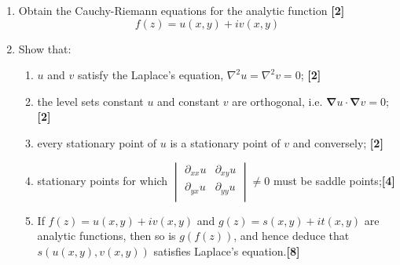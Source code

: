 \documentclass[a4paper]{article}
\begin{document}
\begin{qns}\leavevmode
\begin{enumerate}[label=(\alph*)]
    \item Obtain the Cauchy-Riemann equations for the analytic function \hfill \textbf{[2]}$$f(z)=u(x,y)+iv(x,y)$$
    \item Show that:
    \begin{enumerate}[label=(\roman*)]
        \item $u$ and $v$ satisfy the Laplace's equation, $\nabla^2u=\nabla^2v=0$; \hfill \textbf{[2]}
        \item the level sets constant $u$ and constant $v$ are orthogonal, i.e. $\boldsymbol{\nabla}u\cdot\boldsymbol{\nabla}v=0$; \hfill \textbf{[2]}
        \item every stationary point of $u$ is a stationary point of $v$ and conversely; \hfill \textbf{[2]}
        \item stationary points for which
        $\begin{vmatrix}\partial_{xx}u&\partial_{xy}u\\\partial_{yx}u&\partial_{yy}u\\\end{vmatrix}\neq0$ must be saddle points;\hfill \textbf{[4]}
    \item If $f(z)=u(x,y)+iv(x,y)$ and $g(z)=s(x,y)+it(x,y)$ are analytic functions, then so is $g(f(z))$, and hence deduce that $s(u(x,y),v(x,y))$ satisfies Laplace's equation.\hfill \textbf{[8]}
    \end{enumerate}
\end{enumerate}
\end{qns}
\end{document}
